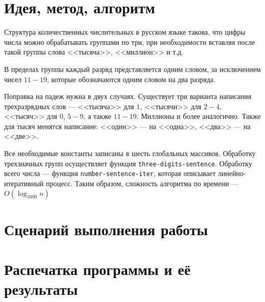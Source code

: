 \documentclass[12pt]{article}
\begin{document}
\section{Идея, метод, алгоритм}
Структура количественных числительных в русском языке такова, что цифры числа можно обрабатывать группами по три, при необходимости вставляя после такой группы слова <<тысяча>>, <<миллион>> и т.д.

В пределах группы каждый разряд представляется одним словом, за исключением чисел $11 - 19$, которые обозначаются одним словом на два разряда.

Поправка на падеж нужна в двух случаях. Существует три варианта написания трехразрядных слов --- <<тысяча>> для $1$, <<тысячи>> для $2-4$, <<тысяч>> для $0$, $5-9$, а также $11-19$. Миллионы и более аналогично. Также для тысяч менятся написание: <<один>> --- на <<одна>>, <<два>> --- на <<две>>.

Все необходимые константы записаны в шесть глобальных массивов. Обработку трехзначных групп осуществляет функция {\tt three-digits-sentence}. Обработку всего числа --- функция {\tt number-sentence-iter}, которая описывает линейно-итеративный процесс. Таким образом, сложность алгоритма по времени --- $O(\log_{1000}{n})$

\section{Сценарий выполнения работы}

\section{Распечатка программы и её результаты}
\end{document}
